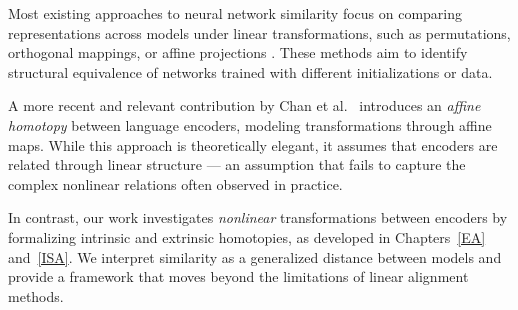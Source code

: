Most existing approaches to neural network similarity focus on comparing representations across models under linear transformations, such as permutations, orthogonal mappings, or affine projections \cite{kornblith_similarity_2019, williams_generalized_2021, li_convergent_2016}. These methods aim to identify structural equivalence of networks trained with different initializations or data.

A more recent and relevant contribution by Chan et al.~\cite{chan_affine_2024} introduces an \emph{affine homotopy} between language encoders, modeling transformations through affine maps.
While this approach is theoretically elegant, it assumes that encoders are related through linear structure — an assumption that fails to capture the complex nonlinear relations often observed in practice.

In contrast, our work investigates \emph{nonlinear} transformations between encoders by formalizing intrinsic and extrinsic homotopies, as developed in Chapters~\ref{EA} and~\ref{ISA}. 
We interpret similarity as a generalized distance between models and provide a framework that moves beyond the limitations of linear alignment methods.
